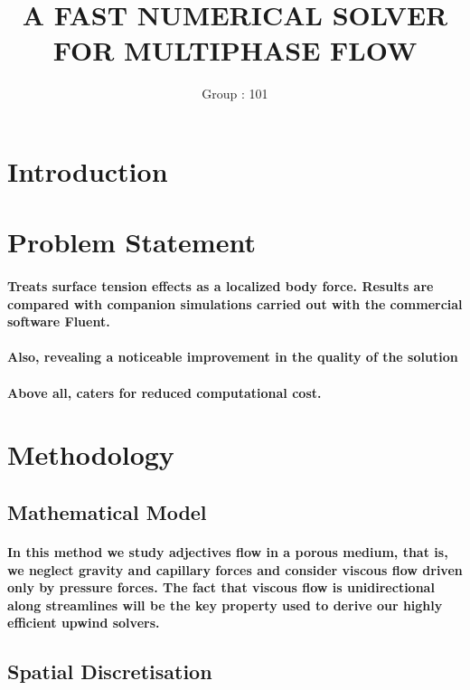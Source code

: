 \documentclass{article}
\begin{document}
		\title{A FAST NUMERICAL SOLVER FOR MULTIPHASE FLOW}
		\author{Group : 101}
		\maketitle
	
		\tableofcontents
	\newpage	

\section{Introduction}
\section{Problem Statement}
	\paragraph{Treats surface tension effects as a localized body force. Results are compared with companion simulations carried 	out with the commercial software Fluent.}
	\paragraph{Also, revealing a noticeable improvement in the quality of the solution}
	\paragraph{Above all, caters for reduced computational cost.}

	
	\section{Methodology}
	
\subsection{Mathematical Model}
	\paragraph{In this method we study adjectives flow in a porous medium, that is, we
	neglect gravity and capillary forces and consider viscous flow driven only by
	pressure forces. The fact that viscous flow is unidirectional along streamlines
	will be the key property used to derive our highly efficient upwind solvers.}
	\subsection{Spatial Discretisation}
\end{document}

